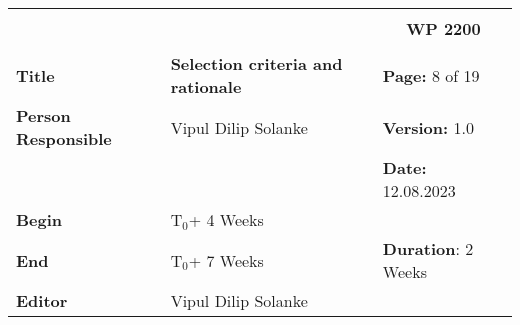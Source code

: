 \begin{table}[!h]
  \begin{center}
    \begin{tabular}{|p{35mm}||p{55mm}|p{50mm}||p{40mm}|}
      \hline
      \multicolumn{3}{|l||}{\textbf{}} & \multicolumn{1}{c|}{}                                                                                                                                                \\
      \multicolumn{3}{|l||}{\textbf{}} & \multicolumn{1}{c|}{\textbf{WP 2200}}                                                                                                                                \\
      \multicolumn{3}{|l||}{\textbf{}} & \multicolumn{1}{c|}{}                                                                                                                                                \\
      \hline\hline
      \textbf{Title}                   & \multicolumn{2}{p{7cm}||}{\textbf{Selection criteria and rationale}}
                                       & \textbf{Page:} 8 of 19                                                                                                                                             \\
      \hline
      \textbf{Person Responsible}        & \multicolumn{2}{l||}{Vipul Dilip Solanke}                                                                                                   & \textbf{Version:} 1.0   \\
      \hline
      \multicolumn{3}{|l||}{}          & \textbf{Date:} 12.08.2023                                                                                                                                          \\
      \hline\hline
      \textbf{Begin}                  & \multicolumn{2}{l||}{T$_0$+ 4 Weeks}                                                                                                                &                         \\
      \hline
      \textbf{End}                    & \multicolumn{2}{l||}{T$_0$+ 7 Weeks}                                                                                                        & \textbf{Duration}: 2 Weeks \\
      \hline\hline
      \textbf{Editor}              & \multicolumn{3}{l|}{Vipul Dilip Solanke}                                                                                                                              \\

\end{tabular}
\end{center}
\end{table}
